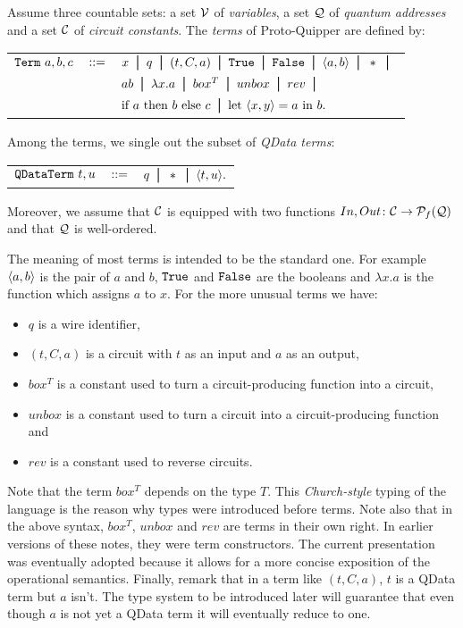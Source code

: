 \documentclass{article}
\begin{document}
\begin{definition}
Assume three countable sets: a set $\mathcal{V}$ of \emph{variables}, a 
set $\mathcal{Q}$ of \emph{quantum addresses} and a set $\mathcal{C}$ of 
\emph{circuit constants}. The \emph{terms} of Proto-Quipper are 
defined by:
\begin{center}
\begin{tabular}{rcl}
$\texttt{Term}~a,b,c$ & $::=$ & $x \bor q \bor (t,C,a) \bor \true 
  \bor \false \bor \p{a,b} \bor * \bor$ \\[0.05in]
& & $ab \bor \lambda x.a \bor box^T \bor unbox \bor rev 
    \bor $\\[0.05in]
& & $\ifthenelse{a}{b}{c} \bor \letin{\p{x,y}}{a}{b}.$
\end{tabular}
\end{center}
Among the terms, we single out the subset of \emph{QData terms}:
\begin{center}
\begin{tabular}{rcl}
$\texttt{QDataTerm}~t,u$ & $::=$ & $q \bor * \bor \p{t,u}.$
\end{tabular}
\end{center}
Moreover, we assume that $\mathcal{C}$ is equipped with two functions 
$In,Out\colon \mathcal{C}\to\mathcal{P}_f(\mathcal{Q})$ and that $\mathcal{Q}$ is 
well-ordered.
\end{definition}

The meaning of most terms is intended to be the standard 
one. For example $\langle a,b\rangle$ is the pair of $a$ and $b$, 
$\texttt{True}$ and $\texttt{False}$ are the booleans and $\lambda x.a$ 
is the function which assigns $a$ to $x$. For the more 
unusual terms we have:
\begin{itemize}
  \item $q$ is a wire identifier,
  \item $(t,C,a)$ is a circuit with $t$ as an input and $a$ as an 
        output,
  \item $box^T$ is a constant used to turn a circuit-producing 
        function into a circuit,
  \item $unbox$ is a constant used to turn a circuit into a 
        circuit-producing function and
  \item $rev$ is a constant used to reverse circuits.
\end{itemize}
Note that the term $box^T$ depends on the type $T$. This 
\emph{Church-style} typing of the language is the reason why types 
were introduced before terms. Note also that in the above syntax, 
$box^T$, $unbox$ and $rev$ are terms in their own right. In earlier 
versions of these notes, they were term constructors. The current 
presentation was eventually adopted because it allows for a more 
concise exposition of the operational semantics. Finally, remark 
that in a term like $(t,C,a)$, $t$ is a QData term but $a$ isn't. 
The type system to be introduced later will guarantee that even 
though $a$ is not yet a QData term it will eventually reduce to 
one. 
\end{document}
